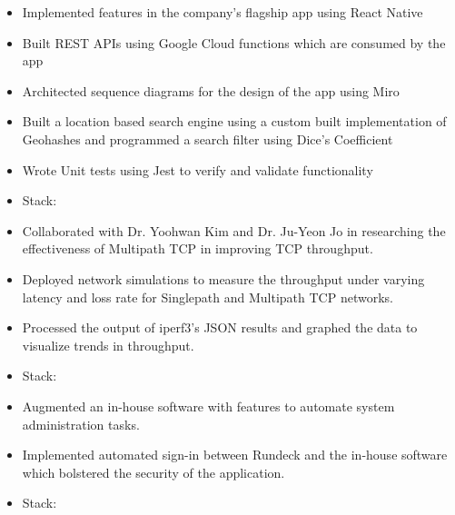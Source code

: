     

\begin{itemize}
    \item Implemented features in the company's flagship app using React Native
    \item Built REST APIs using Google Cloud functions which are consumed by the app
    \item Architected sequence diagrams for the design of the app using Miro
    \item Built a location based search engine using a custom built implementation of Geohashes and programmed a search filter using Dice's Coefficient
    \item Wrote Unit tests using Jest to verify and validate functionality
    \item Stack:      
\end{itemize}
\divider

\begin{itemize}
    \item Collaborated with Dr. Yoohwan Kim and Dr. Ju-Yeon Jo in researching the effectiveness of Multipath TCP in improving TCP throughput.
    \item Deployed network simulations to measure the throughput under varying latency and loss rate for Singlepath and Multipath TCP networks.
    \item Processed the output of iperf3's JSON results and graphed the data to visualize trends in throughput.
    \item Stack:    
\end{itemize}
\divider

\begin{itemize}
    \item Augmented an in-house software with features to automate system administration tasks.
    \item Implemented automated sign-in between Rundeck and the in-house software which bolstered the security of the application.
    \item Stack:  
\end{itemize}

